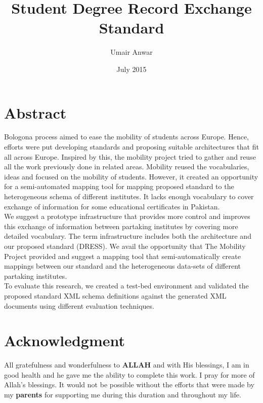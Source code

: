 \documentclass[12pt,a4paper,oneside]{book}
\title{Student Degree Record Exchange Standard}
\author{Umair Anwar}
\date{July 2015}
\begin{document}
\maketitle


\chapter*{Abstract}

 Bologona process aimed to ease the mobility of students across Europe. Hence, efforts were put developing standards and proposing suitable architectures that fit all across Europe. Inspired by this, the mobility project tried to gather and reuse all the work previously done in related areas. Mobility reused the vocabularies, ideas and focused on the mobility of students. However, it created an opportunity for a semi-automated mapping tool for mapping proposed standard to the heterogeneous schema of different institutes. It lacks enough vocabulary to cover exchange of information for some educational certificates in Pakistan. \\
 
 We suggest a prototype infrastructure that provides more control and improves this exchange of information between partaking institutes by covering more detailed vocabulary. The term infrastructure includes both the architecture and our proposed standard (DRESS). We avail the opportunity that The Mobility Project provided and suggest a mapping tool that semi-automatically create mappings between our standard and the heterogeneous data-sets of different partaking institutes. \\
 
To evaluate this research, we created a test-bed environment and validated the proposed standard XML schema definitions against the generated XML documents using different evaluation techniques. 

\certificateoforiginality
\chapter*{Acknowledgment}
All gratefulness and wonderfulness to {\bfseries ALLAH} and with His blessings, I am in good health and he gave me the ability to complete this work. I pray for more of Allah's blessings. It would not be possible without the efforts that were made by my {\bfseries parents} for supporting me during this duration and throughout my life. \\
\end{document}
